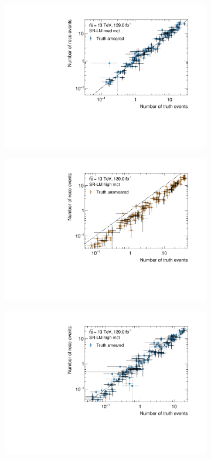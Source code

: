 \begin{figure}
\begin{subfigure}[b]{0.49\linewidth}
	\end{subfigure}\hfill
	\begin{subfigure}[b]{0.49\linewidth}
		\centering\includegraphics[width=\textwidth]{yields_SR-LM_med_mct_smeared}
	\end{subfigure}\hfill
	\begin{subfigure}[b]{0.49\linewidth}
		\centering\includegraphics[width=\textwidth]{yields_SR-LM_high_mct_unsmeared}
	\end{subfigure}\hfill
	\begin{subfigure}[b]{0.49\linewidth}
		\centering\includegraphics[width=\textwidth]{yields_SR-LM_high_mct_smeared}

\end{subfigure}
\end{figure}
